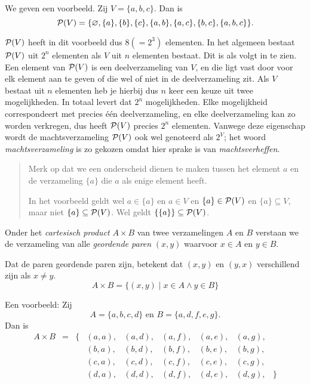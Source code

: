 We geven een voorbeeld. Zij $V=\{a,b,c\}$. Dan is 
$$\mathcal{P}(V)=\{\varnothing, \{a\},\{b\},\{c\},\{a,b\},\{a,c\},\{b,c\},\{a,b,c\} \}.$$

$\mathcal{P}(V)$ heeft in dit voorbeeld dus $8 (=2^3)$ elementen. In het algemeen bestaat $\mathcal{P}(V)$ uit $2^n$ elementen als $V$ uit $n$ elementen bestaat. Dit is als volgt in te zien. Een element van $\mathcal{P}(V)$ is een deelverzameling van $V$, en die ligt vast door voor elk element aan te geven of die wel of niet in de deelverzameling zit. Als $V$ bestaat uit $n$ elementen heb je hierbij dus $n$ keer een keuze uit twee mogelijkheden. In totaal levert dat $2^n$ mogelijkheden. Elke mogelijkheid correspondeert met precies \'e\'en deelverzameling, en elke deelverzameling kan zo worden verkregen, dus heeft $\mathcal{P}(V)$ precies $2^n$ elementen. Vanwege deze eigenschap wordt de machtsverzameling $\mathcal{P}(V)$ ook wel genoteerd als $2^V$; het woord \textit{machtsverzameling} is zo gekozen omdat hier sprake is van \textit{machtsverheffen}.

\begin{quote}
    Merk op dat we een onderscheid dienen te maken tussen het element $a$ en de verzameling $\{a\}$ die $a$ als enige element heeft.
    
    \noindent
    In het voorbeeld geldt wel $a\in \{a\}$ en $a\in V$ en $\{a\}\in\mathcal{P}(V)$ en $\{a\}\subseteq V$, maar niet $\{a\}\subseteq\mathcal{P}(V)$. Wel geldt $\{\{a\}\}\subseteq\mathcal{P}(V)$.
\end{quote}

Onder het \textit{cartesisch product} $A\times B$ van twee verzamelingen $A$ en $B$ verstaan we de verzameling van alle \textit{geordende paren} $(x,y)$ waarvoor $x\in A$ en $y\in B$.

Dat de paren geordende paren zijn, betekent dat $(x,y)$ en $(y,x)$ verschillend zijn als $x\not=y$.
$$A\times B=\{(x,y)\;|\; x\in A\wedge y\in B\}$$

Een voorbeeld: Zij
$$A=\{a,b,c,d\}\text{ en }B=\{a,d,f,e,g\}.$$
Dan is
$$\begin{array}{ccclllllc}
A\times B & = & \bigl\{ 
  & (a,a), & (a,d), & (a,f), & (a,e), & (a,g), & \\
  &&& (b,a), & (b,d), & (b,f), & (b,e), & (b,g), & \\
  &&& (c,a), & (c,d), & (c,f), & (c,e), & (c,g), & \\
  &&& (d,a), & (d,d), & (d,f), & (d,e), & (d,g), & \bigr\} \\
\end{array}$$

